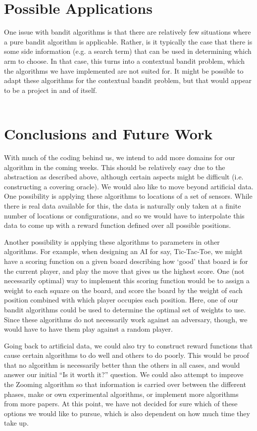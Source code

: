 \documentclass{article}
\begin{document}
\section{Possible Applications}
One issue with bandit algorithms is that there are relatively few
situations where a pure bandit algorithm is applicable.  Rather, is it
typically the case that there is some side information (e.g. a search
term) that can be used in determining which arm to choose.  In that
case, this turns into a contextual bandit problem, which the
algorithms we have implemented are not suited for.  It might be
possible to adapt these algorithms for the contextual bandit problem,
but that would appear to be a project in and of itself.  \\
\\
\section{Conclusions and Future Work}
With much of the coding behind us, we intend to add more domains for
our algorithm in the coming weeks.  This should be relatively easy due to
the abstraction as described above, although certain aspects might be
difficult (i.e.  constructing a covering oracle).  We would also like
to move beyond artificial data.  One possibility is applying these
algorithms to locations of a set of sensors.  While there is real data
available for this, the data is naturally only taken at a finite
number of locations or configurations, and so we would have to
interpolate this data to come up with a reward function defined over
all possible positions.

Another possibility is applying these algorithms to parameters in other
algorithms.  For example, when designing an AI for say, Tic-Tac-Toe, 
we might have a scoring function on a given board describing how
`good' that board is for the current player, and play the move that gives
us the highest score.  One (not necessarily optimal)
way to implement this scoring function would be to assign a weight to each
square on the board, and score the board by the weight of each position
combined with which player occupies each position.  Here, one of our
bandit algorithms could be used to determine the optimal set of weights
to use.  Since these algorithms do not necessarily work against an
adversary, though, we would have to have them play against a random
player.

Going back to artificial data, we could also try to construct reward
functions that cause certain algorithms to do well and others to do poorly.
This would be proof that no algorithm is necessarily better than the others
in all cases, and would answer our initial ``Is it worth it?'' question.
We could also attempt to improve the Zooming algorithm so that information
is carried over between the different phases, make or own experimental
algorithms, or implement more algorithms from more papers.  At this
point, we have not decided for sure which of these options we would like
to pursue, which is also dependent on how much time they take up.
\end{document}
